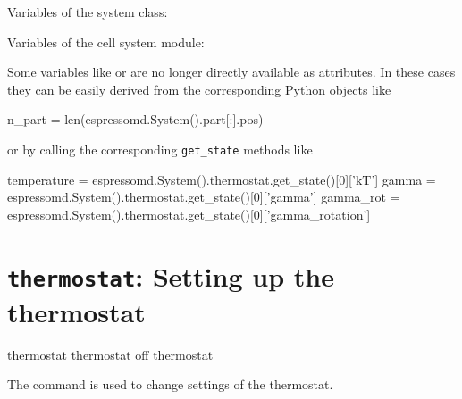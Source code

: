 \vspace{1em}
Variables of the system class:
\begin{pysyntax}
\end{pysyntax}

\vspace{1em}
Variables of the cell system module:
\begin{pysyntax}
\end{pysyntax}

\vspace{1em}
Some variables like  or  are no longer directly 
available as attributes. In these cases they can be easily derived from the 
corresponding Python objects like
\begin{pycode}
  n_part = len(espressomd.System().part[:].pos)
\end{pycode}
or by calling the corresponding \texttt{get\_state} methods like
\begin{pycode}
  temperature = espressomd.System().thermostat.get_state()[0]['kT']
  gamma = espressomd.System().thermostat.get_state()[0]['gamma']
  gamma_rot = espressomd.System().thermostat.get_state()[0]['gamma_rotation']
\end{pycode}


\section{\texttt{thermostat}: Setting up the thermostat}
\label{sec:thermostat}

\begin{pysyntax}
\end{pysyntax}

\begin{essyntax}
   thermostat
   thermostat off
   thermostat 
\end{essyntax}

The  command is used to change settings of the
thermostat. 

